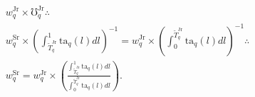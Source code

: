 \documentclass[hidelinks, nonatbib]{elsarticle}
\begin{document}
\begin{enumerate}
\begin{gather}
        w_{q}^{\text{Jr}} \times 
        \mho_{q}^{\text{Jr}}
        \therefore
        \\
        w_{q}^{\text{Sr}} \times 
        \left(
            \int_{\tilde{T}_{q}^{\text{Jr}}}^{1}
                \text{ta}_q(l)
                dl
        \right) ^ {-1}
        = 
        w_{q}^{\text{Jr}} \times 
        \left(
            \int_{0}^{\tilde{T}_{q}^{\text{Jr}}}
                \text{ta}_q(l)
                dl
        \right) ^ {-1}
        \therefore
        \\
        w_{q}^{\text{Sr}}
        = 
        w_{q}^{\text{Jr}}
        \times
        \left(
            \frac{
                \int_{\tilde{T}_{q}^{\text{Jr}}}^{1}
                    \text{ta}_q(l)
                    dl
            }{
                \int_{0}^{\tilde{T}_{q}^{\text{Jr}}}
                    \text{ta}_q(l)
                    dl
            }
        \right)
        .
    \end{gather}


\end{enumerate}
\end{document}
